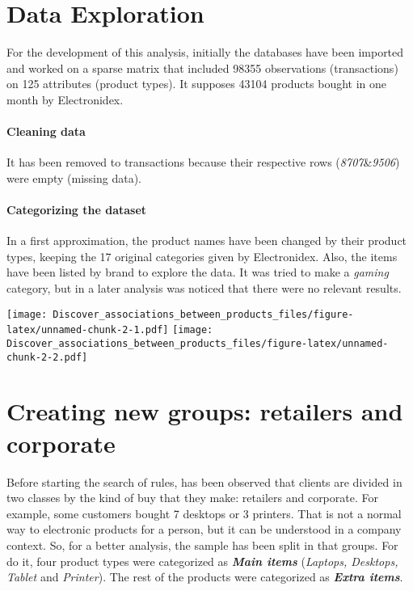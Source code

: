 \documentclass[]{article}
\let\oldparagraph\paragraph
\renewcommand{\paragraph}[1]{\oldparagraph{#1}\mbox{}}
\begin{document}
\hypertarget{data-exploration}{%
\section{Data Exploration}\label{data-exploration}}

For the development of this analysis, initially the databases have been
imported and worked on a sparse matrix that included 98355 observations
(transactions) on 125 attributes (product types). It supposes 43104
products bought in one month by Electronidex.

\hypertarget{cleaning-data}{%
\paragraph{Cleaning data}\label{cleaning-data}}

It has been removed to transactions because their respective rows
(\emph{8707}\&\emph{9506}) were empty (missing data).

\hypertarget{categorizing-the-dataset}{%
\paragraph{Categorizing the dataset}\label{categorizing-the-dataset}}

In a first approximation, the product names have been changed by their
product types, keeping the 17 original categories given by Electronidex.
Also, the items have been listed by brand to explore the data. It was
tried to make a \emph{gaming} category, but in a later analysis was
noticed that there were no relevant results.

\texttt{[image: Discover\_associations\_between\_products\_files/figure-latex/unnamed-chunk-2-1.pdf]}
\texttt{[image: Discover\_associations\_between\_products\_files/figure-latex/unnamed-chunk-2-2.pdf]}

\hypertarget{creating-new-groups-retailers-and-corporate}{%
\section{Creating new groups: retailers and
corporate}\label{creating-new-groups-retailers-and-corporate}}

Before starting the search of rules, has been observed that clients are
divided in two classes by the kind of buy that they make: retailers and
corporate. For example, some customers bought 7 desktops or 3 printers.
That is not a normal way to electronic products for a person, but it can
be understood in a company context. So, for a better analysis, the
sample has been split in that groups. For do it, four product types were
categorized as \textbf{\emph{Main items}} (\emph{Laptops, Desktops,
Tablet} and \emph{Printer}). The rest of the products were categorized
as \textbf{\emph{Extra items}}.
\end{document}
